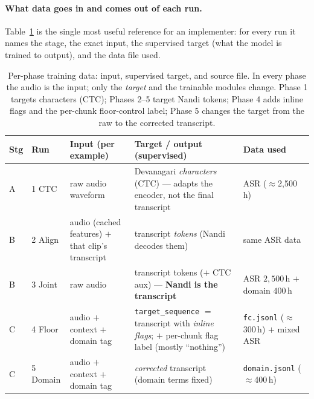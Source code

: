 \documentclass[11pt]{article}
\newcommand{\code}[1]{\texttt{#1}}
\begin{document}
\paragraph{What data goes in and comes out of each run.} Table~\ref{tab:phasedata} is the
single most useful reference for an implementer: for every run it names the stage, the exact
input, the supervised target (what the model is trained to output), and the data file used.
\begin{table}[h]\centering\small
\begin{tabular}{@{}p{0.5cm} p{1.7cm} p{3.1cm} p{4.0cm} p{2.7cm}@{}}
\toprule
Stg & Run & Input (per example) & Target / output (supervised) & Data used\\
\midrule
A & 1 CTC & raw audio waveform & Devanagari \emph{characters} (CTC) --- adapts the encoder, not the final transcript & ASR ($\approx$2{,}500\,h)\\
B & 2 Align & audio (cached features) $+$ that clip's transcript & transcript \emph{tokens} (Nandi decodes them) & same ASR data\\
B & 3 Joint & raw audio & transcript tokens ($+$ CTC aux) --- \textbf{Nandi is the transcript} & ASR $2{,}500$\,h $+$ domain $400$\,h\\
C & 4 Floor & audio $+$ context $+$ domain tag & \code{target\_sequence} $=$ transcript with \emph{inline flags}; $+$ per-chunk flag label (mostly ``nothing'') & \code{fc.jsonl} ($\approx$300\,h) $+$ mixed ASR\\
C & 5 Domain & audio $+$ context $+$ domain tag & \emph{corrected} transcript (domain terms fixed) & \code{domain.jsonl} ($\approx$400\,h)\\
\bottomrule
\end{tabular}
\caption{Per-phase training data: input, supervised target, and source file. In every phase
the audio is the input; only the \emph{target} and the trainable modules change. Phase 1
targets characters (CTC); Phases 2--5 target Nandi tokens; Phase 4 adds inline flags and the
per-chunk floor-control label; Phase 5 changes the target from the raw to the corrected
transcript.}
\label{tab:phasedata}
\end{table}
\end{document}

